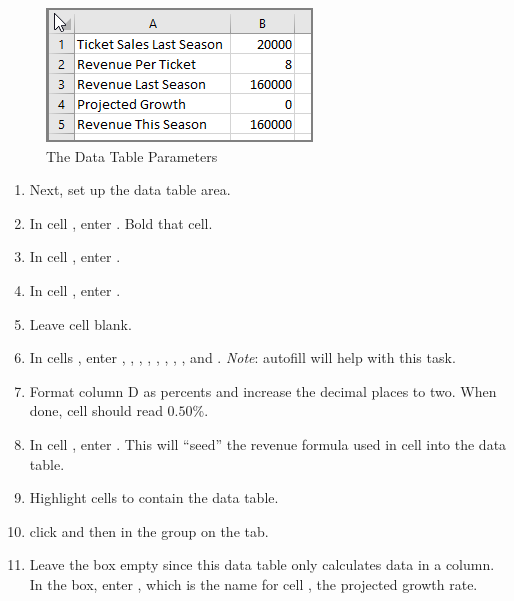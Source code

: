 \begin{enumerate}
\end{enumerate}

\begin{figure}[H]
	\centering
	\includegraphics[width=\maxwidth{.95\linewidth}]{gfx/ch08_fig17}
	\caption{The Data Table Parameters}
	\label{08:fig17}
\end{figure}

\begin{enumerate}[resume]
	 
	\item Next, set up the data table area.
	\item In cell , enter . Bold that cell.
	\item In cell , enter .
	\item In cell , enter .
	\item Leave cell  blank.
	\item In cells , enter , , , , , , , ,  and . \textit{Note}: autofill will help with this task.
	\item Format column D as percents and increase the decimal places to two. When done, cell  should read $ 0.50 $\%.
	\item In cell , enter . This will ``seed'' the revenue formula used in cell  into the data table.
	\item Highlight cells  to contain the data table.
	\item click  and then  in the  group on the  tab.
	\item Leave the  box empty since this data table only calculates data in a column. In the  box, enter , which is the name for cell , the projected growth rate.
	
\end{enumerate}

